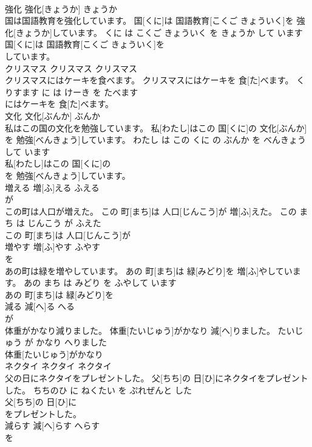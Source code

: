 \documentclass[8pt]{extreport}
\begin{document}
\begin{CJK}{UTF8}{min}
\\	強化	強化[きょうか]	きょうか	
\\	国は国語教育を強化しています。	国[くに]は 国語教育[こくご きょういく]を 強化[きょうか]しています。	くに は こくご きょういく を きょうか して います	
\\	国[くに]は 国語教育[こくご きょういく]を
\\	しています。		
\\	クリスマス	クリスマス	クリスマス	
\\	クリスマスにはケーキを食べます。	クリスマスにはケーキを 食[た]べます。	くりすます に は けーき を たべます	
\\	にはケーキを 食[た]べます。		
\\	文化	文化[ぶんか]	ぶんか	
\\	私はこの国の文化を勉強しています。	私[わたし]はこの 国[くに]の 文化[ぶんか]を 勉強[べんきょう]しています。	わたし は この くに の ぶんか を べんきょう して います	
\\	私[わたし]はこの 国[くに]の
\\	を 勉強[べんきょう]しています。		
\\	増える	増[ふ]える	ふえる	
\\	が		
\\	この町は人口が増えた。	この 町[まち]は 人口[じんこう]が 増[ふ]えた。	この まち は じんこう が ふえた	
\\	この 町[まち]は 人口[じんこう]が
\\	増やす	増[ふ]やす	ふやす	
\\	を		
\\	あの町は緑を増やしています。	あの 町[まち]は 緑[みどり]を 増[ふ]やしています。	あの まち は みどり を ふやして います	
\\	あの 町[まち]は 緑[みどり]を
\\	減る	減[へ]る	へる	
\\	が		
\\	体重がかなり減りました。	体重[たいじゅう]がかなり 減[へ]りました。	たいじゅう が かなり へりました	
\\	体重[たいじゅう]がかなり
\\	ネクタイ	ネクタイ	ネクタイ	
\\	父の日にネクタイをプレゼントした。	父[ちち]の 日[ひ]にネクタイをプレゼントした。	ちちのひ に ねくたい を ぷれぜんと した	
\\	父[ちち]の 日[ひ]に
\\	をプレゼントした。		
\\	減らす	減[へ]らす	へらす	
\\	を		

\end{CJK}
\end{document}
